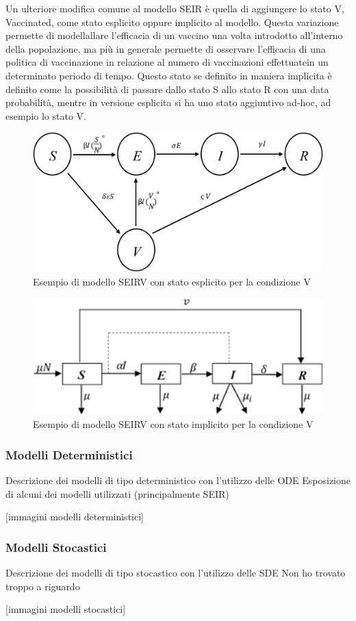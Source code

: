 Un ulteriore modifica comune al modello SEIR è quella di aggiungere lo
stato V, Vaccinated, come stato esplicito oppure implicito al modello. Questa 
variazione permette di modellallare l'efficacia di un vaccino una volta introdotto 
all'interno della popolazione, ma più in generale permette di osservare
l'efficacia di una politica di vaccinazione in relazione al numero di vaccinazioni 
effettuatein un determinato periodo di tempo. Questo stato se definito in maniera
implicita è definito come la possibilità di passare dallo stato S allo stato R 
con una data probabilità, mentre in versione esplicita si ha uno stato aggiuntivo
ad-hoc, ad esempio lo stato V.

\begin{figure}
    \includegraphics[width=\linewidth]{img/seirv_explicit.jpg}
    \caption{Esempio di modello SEIRV con stato esplicito per la condizione V}
    \label{fig:SEIRV_explicit}
\end{figure}

\begin{figure}
    \includegraphics[width=\linewidth]{img/seirv_implicit.jpg}
    \caption{Esempio di modello SEIRV con stato implicito per la condizione V}
    \label{fig:SEIRV_implicito}
\end{figure}

\subsubsection{Modelli Deterministici}
Descrizione dei modelli di tipo deterministico con l'utilizzo delle ODE
Esposizione di alcuni dei modelli utilizzati (principalmente SEIR)

[immagini modelli deterministici]

\subsubsection{Modelli Stocastici}
Descrizione dei modelli di tipo stocastico con l'utilizzo delle SDE
Non ho trovato troppo a riguardo

[immagini modelli stocastici]